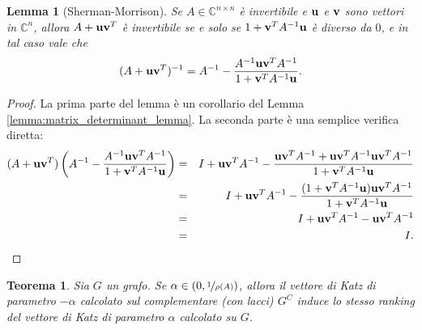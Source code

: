 \documentclass[a4paper]{article}
\newcommand{\CC}{\mathbb{C}}
\newcommand{\vvec}{{\bf v}}
\newcommand{\uvec}{{\bf u}}
\newtheorem{theorem}{Teorema}
\newtheorem{lemma}{Lemma}
\begin{document}
\begin{lemma}[Sherman-Morrison]
    \label{lemma:sherman}
    Se $A \in \CC^{n \times n}$ è invertibile e $\uvec$ e $\vvec$ sono vettori in $\CC^n$, allora $A + \uvec \vvec^T$ è invertibile se e solo se $1 + \vvec^T A^{-1} \uvec$ è diverso da $0$, e in tal caso vale che
    \[
        (A+\uvec \vvec^T)^{-1} = A^{-1} - \frac{A^{-1} \uvec \vvec^T A^{-1}}{1 + \vvec^T A^{-1} \uvec}.
    \]
\end{lemma}

\begin{proof}
    La prima parte del lemma è un corollario del Lemma \ref{lemma:matrix_determinant_lemma}.
    La seconda parte è una semplice verifica diretta:
    \begin{eqnarray}
        (A+\uvec \vvec^T)\left(A^{-1} - \frac{A^{-1} \uvec \vvec^T A^{-1}}{1 + \vvec^T A^{-1} \uvec}\right)
        &=&
        I+\uvec \vvec^TA^{-1} - \frac{\uvec \vvec^TA^{-1} + \uvec \vvec^T A^{-1} \uvec \vvec^T A^{-1}}{1 + \vvec^T A^{-1} \uvec} \nonumber \\
        &=& I+\uvec \vvec^TA^{-1} - \frac{(1+\vvec^T A^{-1} \uvec)\uvec \vvec^TA^{-1}}{1+\vvec^T A^{-1} \uvec} \nonumber \\
        &=& I + \uvec \vvec^T A^{-1} - \uvec \vvec^TA^{-1} \nonumber \\
        &=& I. \nonumber
    \end{eqnarray}
\end{proof}

\begin{theorem}
    \label{th:compl_1}
    Sia $G$ un grafo. Se $\alpha \in (0, \nicefrac{1}{\rho(A)})$, allora il vettore di Katz di parametro $-\alpha$ calcolato sul complementare (con lacci) $G^C$
    induce lo stesso ranking del vettore di Katz di parametro $\alpha$ calcolato su $G$.
\end{theorem}
\end{document}
